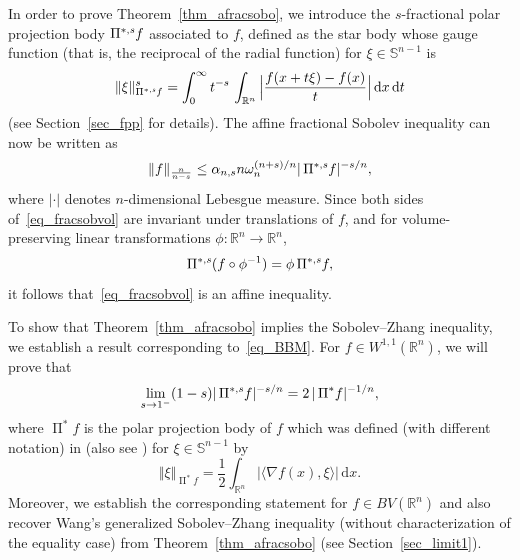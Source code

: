 \documentclass{amsart}
\newcommand{\opp}{\operatorname{\Pi}^*\!}
\newcommand{\ofpp}[1]{\operatorname{\Pi^{\ast,{\it #1}}}\!}
\newcommand{\snvtex}{{\mathbb S}^{n-1}}
\newcommand{\dvtex}{\,\mathrm{d}}
\newcommand{\vol}[1]{ \vert #1\vert}
\begin{document}
\noindent
In order to prove Theorem~\ref{thm_afracsobo}, we introduce the $s$-fractional
polar projection body $\ofpp{s} f$ associated to $f$, defined as the star
body whose gauge function (that is, the reciprocal of the radial function)
for $\xi \in \snvtex $ is
%
\begin{equation}
\Vert{\xi}\Vert _{\ofpp{s}f}^{s}= \int _{0}^{\infty }t^{-s}\, \int _{
\mathbb R^{n}}\Big\vert \frac{f(x +t\xi )-f(x)}{t}\Big\vert \dvtex x\dvtex t
\nonumber \end{equation}
%
(see Section~\ref{sec_fpp} for details). The affine fractional Sobolev
inequality can now be written as
%
\begin{equation}
\label{eq_fracsobvol}
\Vert f\Vert _{{\frac {n}{n-s}}} \le \alpha _{n,s} n \omega _{n}^{({n+s})/n}
\vol{\ofpp{s} f}^{- s/ n},
\end{equation}
%
where $\vol{\cdot}$ denotes $n$-dimensional Lebesgue measure. Since both
sides of~\eqref{eq_fracsobvol} are invariant under translations of
$f$, and for volume-preserving linear transformations
$\phi : \mathbb R^{n}\to \mathbb R^{n}$,
%
\begin{equation*}
\ofpp{s} \,(f\circ \phi ^{-1}) = \phi \ofpp{s} f,
\end{equation*}
%
it follows that~\eqref{eq_fracsobvol} is an affine inequality.

To show that Theorem~\ref{thm_afracsobo} implies the Sobolev--Zhang inequality,
we establish a result corresponding to~\eqref{eq_BBM}. For
$f\in W^{1,1}(\mathbb R^{n})$, we will prove that
%
\begin{equation}
\label{eq_limit}
\lim _{s\to 1^{-}} (1-s) \vol{\ofpp{s}f}^{- s/ n} = 2\, \vol{\opp f}^{-1/n},
\end{equation}
%
where $\opp f$ is the polar projection body of $f$ which was defined (with
different notation) in \cite{Zhang99} (also see \cite{LYZ2002b}) for
$\xi \in \snvtex $ by
%
\begin{equation}
\label{eq_polarprojection_functional}
\Vert \xi \Vert _{\opp f}= \frac {1}{2} \int _{\mathbb R^{n}} \vert
\langle \nabla f(x),\xi \rangle \vert \dvtex x.
\end{equation}
%
Moreover, we establish the corresponding statement for
$f\in BV(\mathbb R^{n})$ and also recover Wang's generalized Sobolev--Zhang
inequality (without characterization of the equality case) from Theorem~\ref{thm_afracsobo} (see Section~\ref{sec_limit1}).
\end{document}

